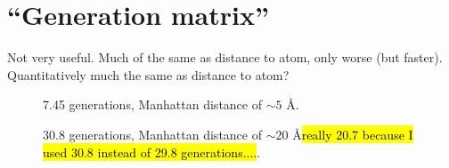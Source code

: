 \section{``Generation matrix''}
Not very useful. Much of the same as distance to atom, only worse (but faster). Quantitatively much the same as distance to atom?
%
\setlength{\myfigwidth}{0.90\textwidth}%
\begin{figure}[htpb]%
    \centering%
    \caption{7.45 generations, Manhattan distance of $\sim 5$ \AA.}%
    \label{fig:generation_matrix_r05}%
\end{figure}%
%
\begin{figure}[htpb]%
    \centering%
    \caption{30.8 generations, Manhattan distance of $\sim 20$ \AA \hl{really 20.7 because I used 30.8 instead of 29.8 generations....}.}%
    \label{fig:generation_matrix_r11}%
\end{figure}%
